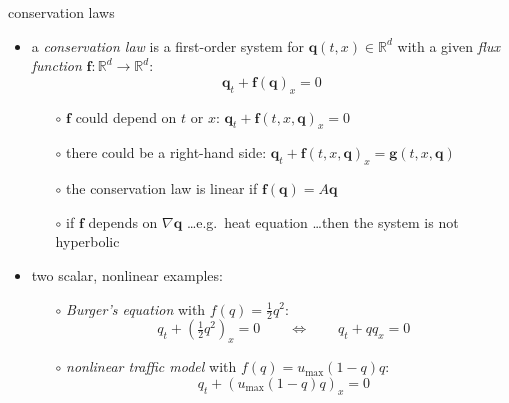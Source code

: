 \documentclass[10pt,hyperref,dvipsnames]{beamer}
\newcommand{\bbf}{\mathbf{f}}
\newcommand{\bg}{\mathbf{g}}
\newcommand{\bq}{\mathbf{q}}
\newcommand{\grad}{\nabla}
\newcommand{\RR}{\mathbb{R}}
\begin{document}
\begin{frame}{conservation laws}

\begin{itemize}
\item a \emph{conservation law} is a first-order system for $\bq(t,x) \in \RR^d$ with a given \emph{flux function} $\bbf:\RR^d\to \RR^d$:
  $$\bq_t + \bbf(\bq)_x=0$$
    \begin{itemize}
    \item[$\circ$] $\bbf$ could depend on $t$ or $x$: \qquad $\bq_t + \bbf(t,x,\bq)_x=0$
    \item[$\circ$] there could be a right-hand side: \qquad $\bq_t + \bbf(t,x,\bq)_x=\bg(t,x,\bq)$
    \item[$\circ$] the conservation law is linear if $\bbf(\bq) = A\bq$
    \item[$\circ$] if $\bbf$ depends on $\grad \bq$ \dots e.g.~heat equation \dots then the system is not hyperbolic
    \end{itemize}

\bigskip
\item two scalar, nonlinear examples:
    \begin{itemize}
    \item[$\circ$] \emph{Burger's equation} with $f(q)=\frac{1}{2} q^2$:
        $$q_t + \left(\tfrac{1}{2} q^2\right)_x = 0 \qquad \iff \qquad q_t + q q_x = 0$$
    \item[$\circ$] \emph{nonlinear traffic model} with $f(q)=u_{\max} (1-q) q$:
        $$q_t + \left(u_{\max} (1-q) q\right)_x = 0$$
    \end{itemize}
\end{itemize}
\end{frame}
\end{document}
